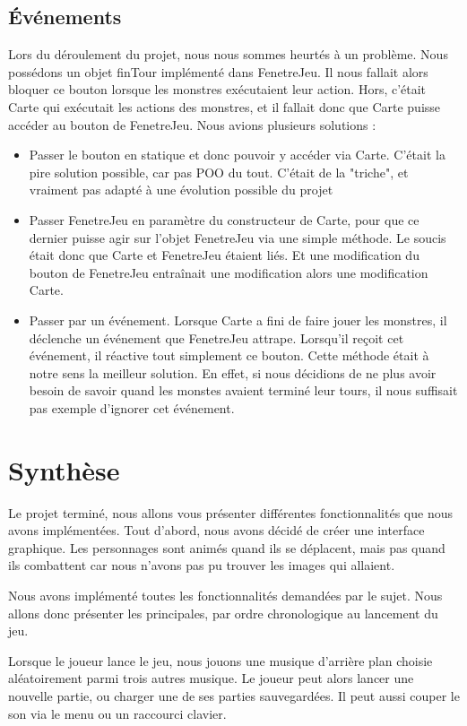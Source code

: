 \documentclass{article}
\begin{document}
  \subsection{Événements}
  Lors du déroulement du projet, nous nous sommes heurtés à un problème.
  Nous possédons un objet finTour implémenté dans FenetreJeu.
  Il nous fallait alors bloquer ce bouton lorsque les monstres exécutaient leur action.
  Hors, c'était Carte qui exécutait les actions des monstres, et il fallait donc que Carte puisse accéder au bouton de FenetreJeu.
  Nous avions plusieurs solutions :
  \begin{itemize}
    \item Passer le bouton en statique et donc pouvoir y accéder via Carte. C'était la pire solution possible, car pas POO du tout.
    C'était de la "triche", et vraiment pas adapté à une évolution possible du projet
    \item Passer FenetreJeu en paramètre du constructeur de Carte, pour que ce dernier puisse agir sur l'objet FenetreJeu via une simple méthode.
    Le soucis était donc que Carte et FenetreJeu étaient liés. Et une modification du bouton de FenetreJeu entraînait une modification alors une modification Carte.
    \item Passer par un événement. Lorsque Carte a fini de faire jouer les monstres, il déclenche un événement que FenetreJeu attrape.
    Lorsqu'il reçoit cet événement, il réactive tout simplement ce bouton. Cette méthode était à notre sens la meilleur solution.
    En effet, si nous décidions de ne plus avoir besoin de savoir quand les monstes avaient terminé leur tours, il nous suffisait pas exemple d'ignorer cet événement.
  \end{itemize}
 

\section{Synthèse}
Le projet terminé, nous allons vous présenter différentes fonctionnalités que nous avons implémentées.
Tout d'abord, nous avons décidé de créer une interface graphique.
Les personnages sont animés quand ils se déplacent, mais pas quand ils combattent car nous n'avons pas pu trouver les images qui allaient.

Nous avons implémenté toutes les fonctionnalités demandées par le sujet.
Nous allons donc présenter les principales, par ordre chronologique au lancement du jeu.

Lorsque le joueur lance le jeu, nous jouons une musique d'arrière plan choisie aléatoirement parmi trois autres musique.
Le joueur peut alors lancer une nouvelle partie, ou charger une de ses parties sauvegardées.
Il peut aussi couper le son via le menu ou un raccourci clavier.
\end{document}
